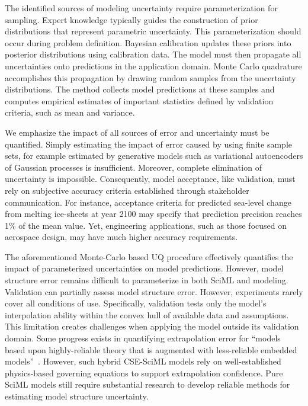 The identified sources of modeling uncertainty require parameterization for sampling. Expert knowledge typically guides the construction of prior distributions that represent parametric uncertainty. This parameterization should occur during problem definition. Bayesian calibration updates these priors into posterior distributions using calibration data. The model must then propagate all uncertainties onto predictions in the application domain. Monte Carlo quadrature accomplishes this propagation by drawing random samples from the uncertainty distributions. The method collects model predictions at these samples and computes empirical estimates of important statistics defined by validation criteria, such as mean and variance.

We emphasize the impact of all sources of error and uncertainty must be quantified. Simply estimating the impact of error caused by using finite sample sets, for example estimated by generative models such as variational autoencoders of Gaussian processes is insufficient. Moreover, complete elimination of uncertainty is impossible. Consequently, model acceptance, like validation, must rely on subjective accuracy criteria established through stakeholder communication. For instance, acceptance criteria for predicted sea-level change from melting ice-sheets at year 2100 may specify that prediction precision reaches 1\% of the mean value. Yet, engineering applications, such as those focused on aerospace design, may have much higher accuracy requirements.

The aforementioned Monte-Carlo based UQ procedure effectively quantifies the impact of parameterized uncertainties on model predictions. However, model structure error remains difficult to parameterize in both SciML and \CSE{} modeling. Validation can partially assess model structure error. However, experiments rarely cover all conditions of use. Specifically, validation tests only the model's interpolation ability within the convex hull of available data and assumptions. This limitation creates challenges when applying the model outside its validation domain. Some progress exists in quantifying extrapolation error for ``models based upon highly-reliable theory that is augmented with less-reliable embedded models''~\cite{Oliver_TSM_CMAME_2015}. However, such hybrid CSE-SciML models rely on well-established physics-based governing equations to support extrapolation confidence. Pure SciML models still require substantial research to develop reliable methods for estimating model structure uncertainty.

